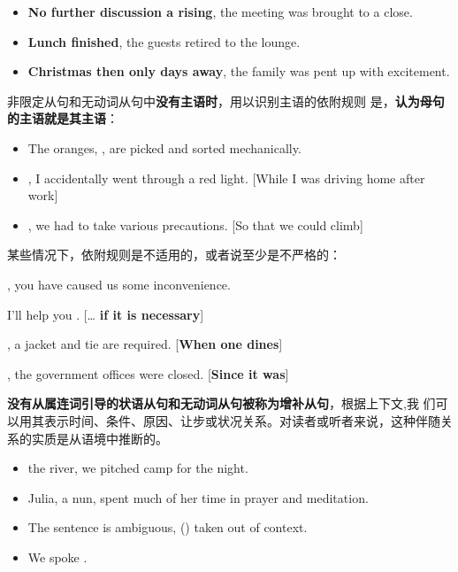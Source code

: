 \begin{itemize}
\item \textbf{No further discussion a rising}, the meeting was brought to a close.
\item \textbf{Lunch finished}, the guests retired to the lounge.
\item \textbf{Christmas then only days away}, the family was pent up with excitement.
\end{itemize}

非限定从句和无动词从句中\textbf{没有主语时}，用以识别主语的依附规则
是，\textbf{认为母句的主语就是其主语}：
\begin{itemize}
\item The oranges, , are picked and sorted
  mechanically.

\item {}, I accidentally went through a red
  light. [While I was driving home after work]

\item {}, we had to take various precautions. [So that
  we could climb]

\end{itemize}

某些情况下，依附规则是不适用的，或者说至少是不严格的：
\begin{description}[style=nextline]
\item[从句是一个主语外接状语, 这时隐含的主语是说话者 I]

  , you have caused us some inconvenience.

\item[隐含的主语是整个主句]

  I'll help you . [\ldots{} \textbf{if it is necessary}]

\item[隐含的主语是一个不定代词或支撑词 it]

  , a jacket and tie are required. [\textbf{When one
  dines}]

  , the government offices were closed. [\textbf{Since it was}]
\end{description}

\textbf{没有从属连词引导的状语从句和无动词从句被称为增补从句}，根据上下文,我
们可以用其表示时间、条件、原因、让步或状况关系。对读者或听者来说，这种伴随关
系的实质是从语境中推断的。
\begin{itemize}
\item {} the river, we pitched camp for the night.
\item Julia,  a nun, spent much of her time in
  prayer and meditation.
\item The sentence is ambiguous, () taken out of context.

\item We spoke .
\end{itemize}
